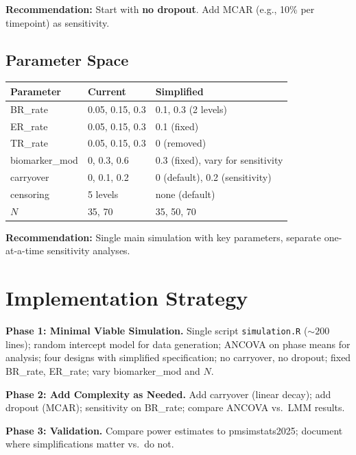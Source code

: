 \documentclass[11pt,letterpaper]{article}
\begin{document}
\textbf{Recommendation:} Start with \textbf{no dropout}. Add MCAR
(e.g., 10\% per timepoint) as sensitivity.


\subsection{Parameter Space}

\begin{table}[h]
\centering\small
\begin{tabular}{@{}lll@{}}
\toprule
Parameter & Current & Simplified \\
\midrule
BR\_rate & 0.05, 0.15, 0.3 & 0.1, 0.3 (2 levels) \\
ER\_rate & 0.05, 0.15, 0.3 & 0.1 (fixed) \\
TR\_rate & 0.05, 0.15, 0.3 & 0 (removed) \\
biomarker\_mod & 0, 0.3, 0.6 & 0.3 (fixed), vary for sensitivity \\
carryover & 0, 0.1, 0.2 & 0 (default), 0.2 (sensitivity) \\
censoring & 5 levels & none (default) \\
$N$ & 35, 70 & 35, 50, 70 \\
\bottomrule
\end{tabular}
\end{table}

\textbf{Recommendation:} Single main simulation with key parameters,
separate one-at-a-time sensitivity analyses.


\section{Implementation Strategy}

\textbf{Phase 1: Minimal Viable Simulation.}
Single script \texttt{simulation.R} (${\sim}200$ lines); random
intercept model for data generation; ANCOVA on phase means for analysis;
four designs with simplified specification; no carryover, no dropout;
fixed BR\_rate, ER\_rate; vary biomarker\_mod and $N$.

\textbf{Phase 2: Add Complexity as Needed.}
Add carryover (linear decay); add dropout (MCAR); sensitivity on
BR\_rate; compare ANCOVA vs.\ LMM results.

\textbf{Phase 3: Validation.}
Compare power estimates to pmsimstats2025; document where
simplifications matter vs.\ do not.
\end{document}
